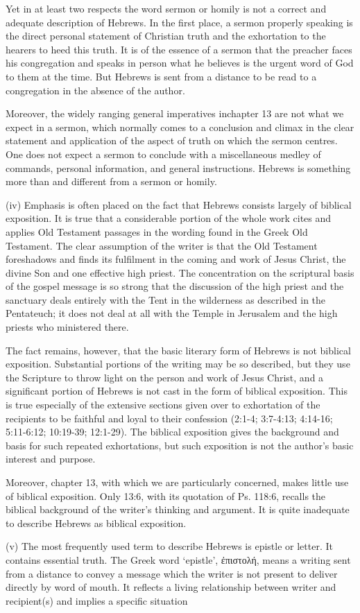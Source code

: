 Yet in at least two respects the word sermon or homily is not a correct and
adequate description of Hebrews.
In the first place, a sermon properly speaking is the direct personal statement
of Christian truth and the exhortation to the hearers to heed this truth.
It is of the essence of a sermon that the preacher faces his congregation and
speaks in person what he believes is the urgent word of God to them at the time.
But Hebrews is sent from a distance to be read to a congregation in the absence
of the author.

Moreover, the widely ranging general imperatives inchapter 13 are not what we
expect in a sermon, which normally comes to a conclusion and climax in the clear
statement and application of the aspect of truth on which the sermon centres.
One does not expect a sermon to conclude with a miscellaneous medley of
commands, personal information, and general instructions.
Hebrews is something more than and different from a sermon or homily.

(iv) Emphasis is often placed on the fact that Hebrews consists largely of
biblical exposition.
It is true that a considerable portion of the whole work cites and applies Old
Testament passages in the wording found in the Greek Old Testament.
The clear assumption of the writer is that the Old Testament foreshadows and
finds its fulfilment in the coming and work of Jesus Christ, the divine Son and
one effective high priest.
The concentration on the scriptural basis of the gospel message is so strong
that the discussion of the high priest and the sanctuary deals entirely with the
Tent in the wilderness as described in the Pentateuch; it does not deal at all
with the Temple in Jerusalem and the high priests who ministered there.

The fact remains, however, that the basic literary form of Hebrews is not
biblical exposition.
Substantial portions of the writing may be so described, but they use the
Scripture to throw light on the person and work of Jesus Christ, and a
significant portion of Hebrews is not cast in the form of biblical exposition.
This is true especially of the extensive sections given over to exhortation of
the recipients to be faithful and loyal to their confession (2:1-4; 3:7-4:13;
4:14-16; 5:11-6:12; 10:19-39; 12:1-29).
The biblical exposition gives the background and basis for such repeated
exhortations, but such exposition is not the author's basic interest and
purpose.

Moreover, chapter 13, with which we are particularly concerned, makes little use
of biblical exposition.
Only 13:6, with its quotation of Ps. 118:6, recalls the biblical background of
the writer's thinking and argument.
It is quite inadequate to describe Hebrews as biblical exposition.

(v) The most frequently used term to describe Hebrews is epistle or letter.
It contains essential truth.
The Greek word `epistle', ἐπιστολή, means a writing sent from a distance to
convey a message which the writer is not present to deliver directly by word of
mouth.
It reflects a living relationship between writer and recipient(s) and implies a
specific situation
